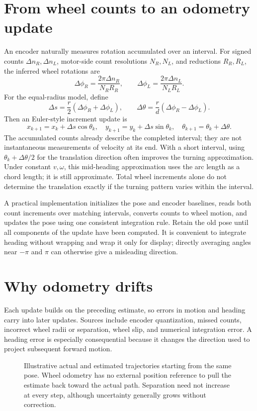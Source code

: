 \section{From wheel counts to an odometry update}
An encoder naturally measures rotation accumulated over an interval.
For signed counts $\Delta n_R,\Delta n_L$, motor-side count resolutions
$N_R,N_L$, and reductions $R_R,R_L$, the inferred wheel rotations are
\[
 \Delta\phi_R=\frac{2\pi\Delta n_R}{N_RR_R},\qquad
 \Delta\phi_L=\frac{2\pi\Delta n_L}{N_LR_L}.
\]
For the equal-radius model, define
\begin{equation}
 \Delta s=\frac r2(\Delta\phi_R+\Delta\phi_L),\qquad
 \Delta\theta=\frac r d(\Delta\phi_R-\Delta\phi_L).
\end{equation}
Then an Euler-style increment update is
\[
 x_{k+1}=x_k+\Delta s\cos\theta_k,\quad
 y_{k+1}=y_k+\Delta s\sin\theta_k,\quad
 \theta_{k+1}=\theta_k+\Delta\theta.
\]
The accumulated counts already describe the completed interval; they are
not instantaneous measurements of velocity at its end. With a short
interval, using $\theta_k+\Delta\theta/2$ for the translation direction
often improves the turning approximation. Under constant $v,\omega$, this
mid-heading approximation uses the arc length as a chord length; it is
still approximate. Total wheel increments alone do not determine the
translation exactly if the turning pattern varies within the interval.

A practical implementation initializes the pose and encoder baselines,
reads both count increments over matching intervals, converts counts to
wheel motion, and updates the pose using one consistent integration rule.
Retain the old pose until all components of the update have been computed.
It is convenient to integrate heading without wrapping and wrap it only
for display; directly averaging angles near $-\pi$ and $\pi$ can otherwise
give a misleading direction.

\clearpage
\section{Why odometry drifts}
Each update builds on the preceding estimate, so errors in motion and
heading carry into later updates. Sources include encoder quantization,
missed counts, incorrect wheel radii or separation, wheel slip, and numerical
integration error. A heading error is especially consequential because it
changes the direction used to project subsequent forward motion.

\begin{figure}[htbp]
\centering
\caption{Illustrative actual and estimated trajectories starting from the
same pose. Wheel odometry has no external position reference to pull the
estimate back toward the actual path. Separation need not increase at
every step, although uncertainty generally grows without correction.}
\end{figure}

